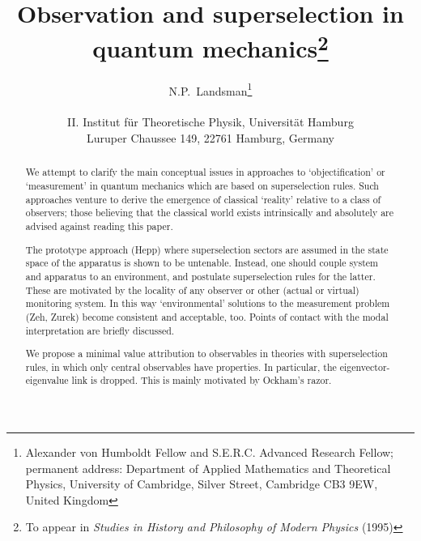 \setlength{\baselineskip}{1.5\baselineskip}
\thispagestyle{empty}
\title{Observation and superselection in quantum mechanics\thanks{To appear in
{\em Studies in
History and Philosophy of Modern Physics} (1995)}} \author{
N.P.~Landsman\thanks{Alexander von
Humboldt Fellow and  S.E.R.C. Advanced Research Fellow; permanent address:
Department of Applied
Mathematics and Theoretical Physics, University of Cambridge, Silver Street,
Cambridge CB3 9EW, United Kingdom}\\ \mbox{}\hfill \\ II. Institut f\"{u}r
Theoretische Physik,
Universit\"{a}t Hamburg\\ Luruper Chaussee 149, 22761 Hamburg, Germany }
\maketitle
\begin{abstract}
We attempt to clarify the main conceptual issues in approaches to
`objectification' or `measurement'
in quantum mechanics which are based on superselection rules.
Such approaches  venture to derive the emergence of classical `reality'
relative to a class of observers; those believing that the classical world
exists intrinsically and
absolutely are advised against reading this paper.

The prototype approach (Hepp) where superselection sectors are assumed in the
state space of the
apparatus is shown to be untenable. Instead, one should couple system and
apparatus to an environment,
and postulate superselection rules for the latter. These are motivated by the
locality of any
observer or other (actual or virtual) monitoring system. In this way
`environmental' solutions to
the measurement problem (Zeh, Zurek) become consistent and acceptable, too.
Points of contact with
the modal interpretation are briefly discussed.

We propose a minimal value attribution to observables  in theories with
superselection rules,
 in which only central   observables have properties.
In particular, the eigenvector-eigenvalue link is dropped. This is mainly
motivated by Ockham's
razor.
 \end{abstract}
 \newpage
